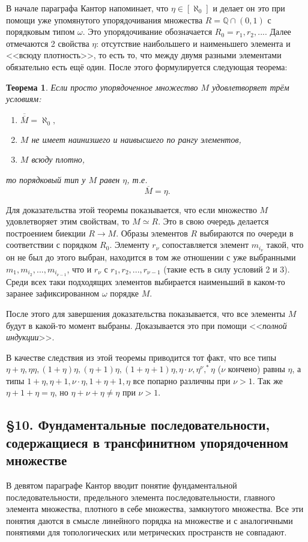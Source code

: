 \documentclass[a4paper,12pt]{extarticle}
\newtheorem{theorem}{Теорема}[subsection]
\theoremstyle{definition}
\newcommand{\cit}[1]{<<\textit{#1}>>}
\newcommand{\car}[1]{\overline{\overline{#1}}}
\begin{document}
В начале параграфа Кантор напоминает, что $\eta \in [\aleph_0]$ и делает он это при помощи
уже упомянутого упорядочивания множества $R = \mathbb{Q} \cap (0,1)$ с порядковым типом $\omega$.
Это упорядочивание обозначается $R_0 = {r_1, r_2, ...}$.
Далее отмечаются 2 свойства $\eta$: отсутствие наибольшего и наименьшего элемента и <<всюду плотность>>, то есть то, что между двумя разными элементами обязательно есть ещё один.
После этого формулируется следующая теорема:
\begin{theorem}
    Если просто упорядоченное множество $M$ удовлетворяет трём условиям:
    \begin{enumerate}
        \item $\car{M} = \aleph_0,$
        \item $M$ не имеет наинизшего и наивысшего по рангу элементов,
        \item $M$ всюду плотно,
    \end{enumerate}
    то порядковый тип у $M$ равен $\eta$, т.е. $$\overline{M} = \eta.$$
\end{theorem}
Для доказательства этой теоремы показывается, что если множество $M$ удовлетворяет этим свойствам, то $M \simeq R$.
Это в свою очередь делается построением биекции $R \rightarrow M$.
Образы элементов $R$ выбираются по очереди в соответствии с порядком $R_0$.
Элементу $r_\nu$ сопоставляется элемент $m_{i_\nu}$ такой, что он не был до этого выбран,
находится в том же отношении с уже выбранными $m_1, m_{i_2}, ..., m_{i_{\nu - 1}}$, что и $r_\nu$ с $r_1, r_2, ..., r_{\nu - 1}$ (такие есть в силу условий 2 и 3).
Среди всех таки подходящих элементов выбирается наименьший в каком-то заранее зафиксированном $\omega$ порядке $M$.

После этого для завершения доказательства показывается, что все элементы $M$ будут в какой-то момент выбраны.
Доказывается это при помощи \cit{полной индукции}.

В качестве следствия из этой теоремы приводится тот факт, что все типы $\eta + \eta, \eta\eta, (1 + \eta)\eta, (\eta + 1)\eta, (1 + \eta + 1)\eta, \eta \cdot \nu, \eta^{\nu}, ^*\eta$ ($\nu$ кончено) равны $\eta$,
а типы $1 + \eta, \eta + 1, \nu \cdot \eta, 1 + \eta + 1, \eta$ все попарно различны при $\nu > 1$.
Так же $\eta + 1 + \eta = \eta$, но $\eta + \nu + \eta \neq \eta$ при $\nu > 1$.

\subsection{\S 10. Фундаментальные последовательности, содержащиеся в трансфинитном упорядоченном множестве}
В девятом параграфе Кантор вводит понятие фундаментальной последовательности, предельного элемента последовательности,
главного элемента множества, плотного в себе множества, замкнутого множества.
Все эти понятия даются в смысле линейного порядка на множестве и с аналогичными понятиями для топологических или метрических пространств не совпадают.
\end{document}
